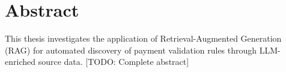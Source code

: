 \chapter*{Abstract}
% 

This thesis investigates the application of Retrieval-Augmented Generation (RAG) for automated discovery of payment validation rules through LLM-enriched source data. [TODO: Complete abstract]